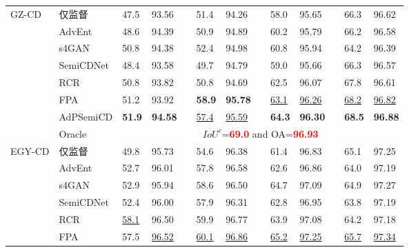 \documentclass[lang=chs, degree=master, blindreview=false, adobe=false]{yanputhesis}
\begin{document}
\begin{table}[!htbp]
{\begin{tabular}{p{20mm}p{25mm}p{8mm}p{8mm}cp{8mm}p{8mm}cp{8mm}p{8mm}cp{8mm}p{8mm}}
      \bottomrule
      \multirow{8}{*}{GZ-CD}
      & 仅监督   &   47.5 & 93.56 && 51.4 & 94.26 && 58.0 & 95.65 && 66.3 & 96.62 \\ %
      & AdvEnt\cite{vu2019advent}& 48.6 & 94.39 && 50.9 & 94.89 && 60.2 & 95.79 && 66.2 & 96.58 \\ %
      & s4GAN\cite{mittal2019semi}& 50.8 & 94.38 && 52.4 & 94.98 && 60.8 & 95.94 && 64.2 & 96.39 \\
      & SemiCDNet\cite{peng2021SemiCDNet} & 48.4 & 93.58 && 49.7 & 94.79 && 59.0 & 95.66 && 66.3 & 96.57 \\ %
      & RCR\cite{bandara2022RCR}& 50.8 & 93.82 && 50.8 & 94.69 && 62.5 & 96.07 && 67.8 & 96.61 \\
      & FPA\cite{Zhang2023FPA}& \cellcolor{white}51.2 & \cellcolor{white}93.92 && \cellcolor{mycyan}\textbf{58.9} & \cellcolor{mycyan}\textbf{95.78} && \underline{63.1} & \underline{96.26} && \underline{68.2} & \underline{96.82} \\
      \rowcolor{mycyan}
      \multirow{-8}{*}{\cellcolor{white}}& \cellcolor{white}AdPSemiCD   &   \textbf{51.9} & \textbf{94.58} && \cellcolor{white}\underline{57.4} & \cellcolor{white}\underline{95.59} && \textbf{64.3} & \textbf{96.30} && \textbf{68.5} & \textbf{96.88} \\%
      \cline{2-13}
      & Oracle & \multicolumn{11}{c}{$ IoU^c$=\textcolor{red}{\bf 69.0} and OA=\textcolor{red}{\bf 96.93}} \\
      \bottomrule
      \multirow{8}{*}{EGY-CD}
      & 仅监督   &   49.8 & 95.73 && 54.6 & 96.38 && 61.4 & 96.83 && 65.1 & 97.25 \\ %
      & AdvEnt\cite{vu2019advent}& 52.7 & 96.01 && 57.8 & 96.58 && 62.6 & 96.86 && 64.0 & 97.19 \\ %
      & s4GAN\cite{mittal2019semi}& 52.9 & 95.94 && 58.6 & 96.50 && 64.7 & 97.09 && 64.9 & 97.27 \\
      & SemiCDNet\cite{peng2021SemiCDNet} & 52.4 & 96.00 && 57.9 & 96.31 && 62.8 & 96.95 && 63.8 & 97.19 \\ %
      & RCR\cite{bandara2022RCR}& \underline{58.1} & 96.50 && 59.9 & 96.77 && 63.9 & 97.08 && 64.2 & 97.18 \\

      \multirow{-7}{*}{\cellcolor{white}}& \cellcolor{white}
      FPA\cite{Zhang2023FPA}& 57.5 & \underline{96.52} && \underline{60.1} & \underline{96.86} && \underline{65.2} & \underline{97.25} && \underline{65.7} & \underline{97.34} \\


\end{tabular}}
\end{table}
\end{document}
